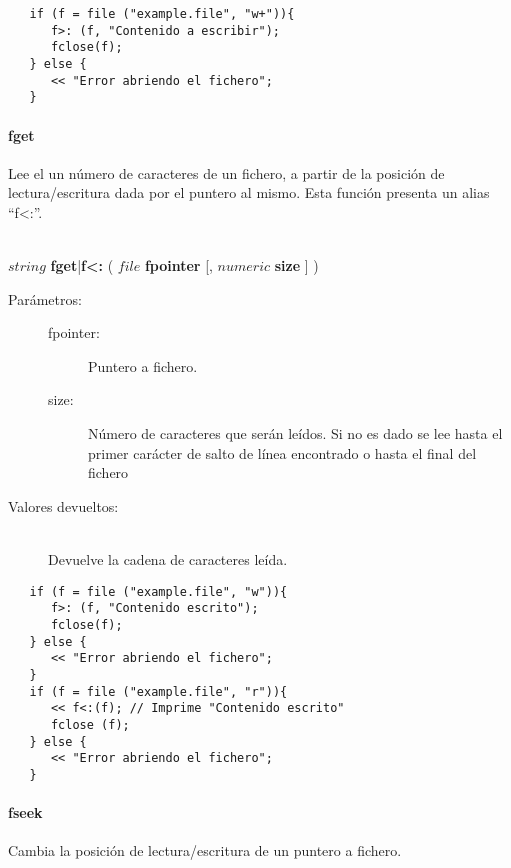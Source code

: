 \begin{lstlisting}  
   if (f = file ("example.file", "w+")){
      f>: (f, "Contenido a escribir"); 
      fclose(f);
   } else {
      << "Error abriendo el fichero";
   }
\end{lstlisting}

\paragraph{fget}
Lee el un número de caracteres de un fichero, a partir de la posición de lectura/escritura dada por el puntero al mismo. Esta función presenta un alias ``f<:''.

\begin{framed}
\hfill \\ $string$ \textbf{fget}|\textbf{f<:} ( $file$ \textbf{fpointer} [, $numeric$ \textbf{size} ]  )  
\begin{description}
\item [Parámetros:] \hfill 
   \begin{description}
   \item[fpointer:] Puntero a fichero. 
   \item[size:] Número de caracteres que serán leídos. Si no es dado se lee hasta el primer carácter de salto de línea encontrado o hasta el final del fichero 
   \end{description}
\item[Valores devueltos:] \hfill \\
   Devuelve la cadena de caracteres leída.
\end{description}
\end{framed}

\begin{lstlisting}  
   if (f = file ("example.file", "w")){
      f>: (f, "Contenido escrito"); 
      fclose(f);
   } else {
      << "Error abriendo el fichero";
   }
   if (f = file ("example.file", "r")){
      << f<:(f); // Imprime "Contenido escrito"
      fclose (f);
   } else {
      << "Error abriendo el fichero";
   }
\end{lstlisting}

\paragraph{fseek}
Cambia la posición de lectura/escritura de un puntero a fichero.

